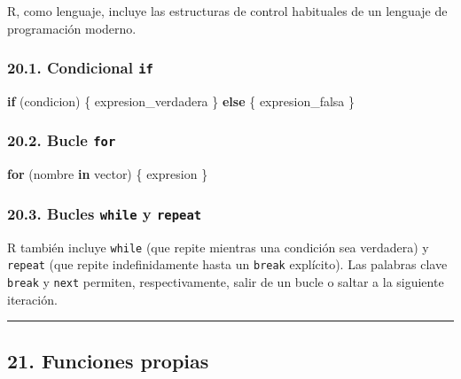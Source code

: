 \documentclass[
  jou,
  floatsintext,
  longtable,
  a4paper,
  nolmodern,
  notxfonts,
  notimes,
  12pt,
  colorlinks=true,linkcolor=blue,citecolor=blue,urlcolor=blue]{apa7}
\newenvironment{Shaded}{\begin{snugshade}}{\end{snugshade}}
\newcommand{\ControlFlowTok}[1]{\textcolor[rgb]{0.00,0.23,0.31}{\textbf{#1}}}
\newcommand{\NormalTok}[1]{\textcolor[rgb]{0.00,0.23,0.31}{#1}}
\begin{document}
R, como lenguaje, incluye las estructuras de control habituales de un
lenguaje de programación moderno.

\subsubsection{\texorpdfstring{20.1. Condicional
\texttt{if}}{20.1. Condicional if}}\label{condicional-if}

\begin{Shaded}
\begin{Highlighting}[]
\ControlFlowTok{if}\NormalTok{ (condicion) \{}
\NormalTok{  expresion\_verdadera}
\NormalTok{\} }\ControlFlowTok{else}\NormalTok{ \{}
\NormalTok{  expresion\_falsa}
\NormalTok{\}}
\end{Highlighting}
\end{Shaded}

\subsubsection{\texorpdfstring{20.2. Bucle
\texttt{for}}{20.2. Bucle for}}\label{bucle-for}

\begin{Shaded}
\begin{Highlighting}[]
\ControlFlowTok{for}\NormalTok{ (nombre }\ControlFlowTok{in}\NormalTok{ vector) \{}
\NormalTok{  expresion}
\NormalTok{\}}
\end{Highlighting}
\end{Shaded}

\subsubsection{\texorpdfstring{20.3. Bucles \texttt{while} y
\texttt{repeat}}{20.3. Bucles while y repeat}}\label{bucles-while-y-repeat}

R también incluye \texttt{while} (que repite mientras una condición sea
verdadera) y \texttt{repeat} (que repite indefinidamente hasta un
\texttt{break} explícito). Las palabras clave \texttt{break} y
\texttt{next} permiten, respectivamente, salir de un bucle o saltar a la
siguiente iteración.

\begin{center}\rule{0.5\linewidth}{0.5pt}\end{center}

\subsection{21. Funciones propias}\label{funciones-propias}
\end{document}
